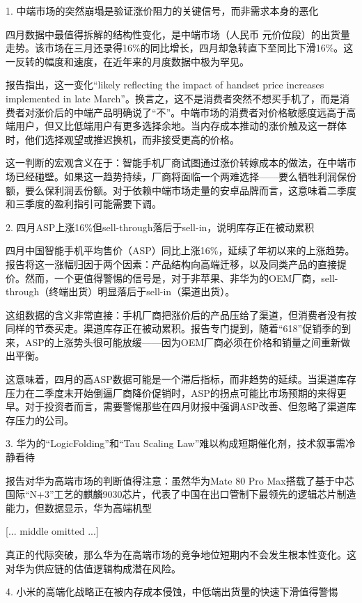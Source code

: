 \documentclass[11pt]{ctexart}
\begin{document}
1. 中端市场的突然崩塌是验证涨价阻力的关键信号，而非需求本身的恶化

四月数据中最值得拆解的结构性变化，是中端市场（人民币 元价位段）的出货量走势。该市场在三月还录得16\%的同比增长，四月却急转直下至同比下滑16\%。这一反转的幅度和速度，在近年来的月度数据中极为罕见。

报告指出，这一变化“likely reflecting the impact of handset price increases implemented in late March”。换言之，这不是消费者突然不想买手机了，而是消费者对涨价后的中端产品明确说了“不”。中端市场的消费者对价格敏感度远高于高端用户，但又比低端用户有更多选择余地。当内存成本推动的涨价触及这一群体时，他们选择观望或推迟换机，而非接受更高的价格。

这一判断的宏观含义在于：智能手机厂商试图通过涨价转嫁成本的做法，在中端市场已经碰壁。如果这一趋势持续，厂商将面临一个两难选择——要么牺牲利润保份额，要么保利润丢份额。对于依赖中端市场走量的安卓品牌而言，这意味着二季度和三季度的盈利指引可能需要下调。

2. 四月ASP上涨16\%但sell-through落后于sell-in，说明库存正在被动累积

四月中国智能手机平均售价（ASP）同比上涨16\%，延续了年初以来的上涨趋势。报告将这一涨幅归因于两个因素：产品结构向高端迁移，以及同类产品的直接提价。然而，一个更值得警惕的信号是，对于非苹果、非华为的OEM厂商，sell-through（终端出货）明显落后于sell-in（渠道出货）。

这组数据的含义非常直接：手机厂商把涨价后的产品压给了渠道，但消费者没有按同样的节奏买走。渠道库存正在被动累积。报告专门提到，随着“618”促销季的到来，ASP的上涨势头很可能放缓——因为OEM厂商必须在价格和销量之间重新做出平衡。

这意味着，四月的高ASP数据可能是一个滞后指标，而非趋势的延续。当渠道库存压力在二季度末开始倒逼厂商降价促销时，ASP的拐点可能比市场预期的来得更早。对于投资者而言，需要警惕那些在四月财报中强调ASP改善、但忽略了渠道库存压力的公司。

3. 华为的“LogicFolding”和“Tau Scaling Law”难以构成短期催化剂，技术叙事需冷静看待

报告对华为高端市场的判断值得注意：虽然华为Mate 80 Pro Max搭载了基于中芯国际“N+3”工艺的麒麟9030芯片，代表了中国在出口管制下最领先的逻辑芯片制造能力，但数据显示，华为高端机型

[... middle omitted ...]

真正的代际突破，那么华为在高端市场的竞争地位短期内不会发生根本性变化。这对华为供应链的估值逻辑构成潜在风险。

4. 小米的高端化战略正在被内存成本侵蚀，中低端出货量的快速下滑值得警惕
\end{document}
